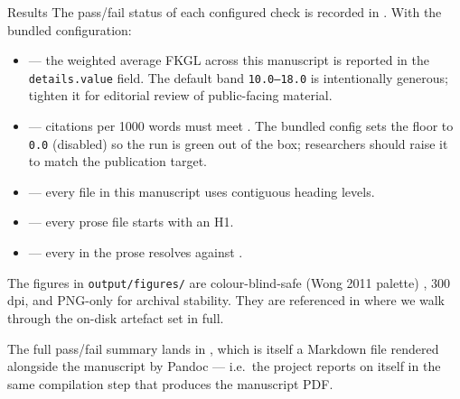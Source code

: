 \documentclass[
  ignorenonframetext,
]{beamer}
\providecommand{\tightlist}{%
  \setlength{\itemsep}{0pt}\setlength{\parskip}{0pt}}
\begin{document}
\begin{frame}{Results}
The pass/fail status of each configured check is recorded in
. With the bundled configuration:

\begin{itemize}
\tightlist
\item
  \textbf{} --- the weighted average FKGL
  across this manuscript is reported in the 
  \texttt{details.value} field. The default band \texttt{10.0–18.0} is
  intentionally generous; tighten it for editorial review of
  public-facing material.
\item
  \textbf{} --- citations per
  1000 words must meet .
  The bundled config sets the floor to \texttt{0.0} (disabled) so the
  run is green out of the box; researchers should raise it to match the
  publication target.
\item
  \textbf{} --- every file in this
  manuscript uses contiguous heading levels.
\item
  \textbf{} --- every prose file starts
  with an H1.
\item
  \textbf{} --- every
  \texttt{\breakseq{[@key]}} in the prose resolves against
  .
\end{itemize}

The figures in \texttt{output/figures/} are colour-blind-safe (Wong 2011
palette) , 300 dpi, and PNG-only for archival
stability. They are referenced in  where
we walk through the on-disk artefact set in full.

The full pass/fail summary lands in ,
which is itself a Markdown file rendered alongside the manuscript by
Pandoc --- i.e.~the project reports on itself in the same compilation
step that produces the manuscript PDF.
\end{frame}
\end{document}
